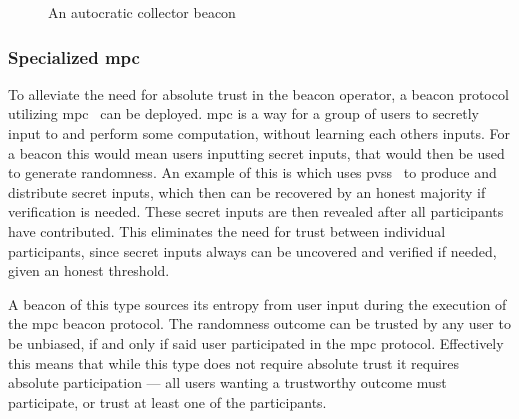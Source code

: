 \begin{figure*}[htb]
    \centering
    \footnotesize
    \caption{An autocratic collector beacon}\label{fig:autocratic_beacon}
\end{figure*}


\subsubsection{Specialized \gls{mpc}}\label{ssub:specialized_mpc}
To alleviate the need for absolute trust in the beacon operator, a beacon protocol utilizing \acrfull{mpc}~\cite{goldreich1998secure} can be deployed. \gls{mpc} is a way for a group of users to secretly input to and perform some computation, without learning each others inputs.
For a beacon this would mean users inputting secret inputs, that would then be used to generate randomness.
An example of this is  which uses \gls{pvss}~\cite{stadler1996publicly} to produce and distribute secret inputs, which then can be recovered by an honest majority if verification is needed.
These secret inputs are then revealed after all participants have contributed.
This eliminates the need for trust between individual participants, since secret inputs always can be uncovered and verified if needed, given an honest threshold.

A beacon of this type sources its entropy from user input during the execution of the \gls{mpc} beacon protocol.
The randomness outcome can be trusted by any user to be unbiased, if and only if said user participated in the \gls{mpc} protocol.
Effectively this means that while this type does not require absolute trust it requires absolute participation --- all users wanting a trustworthy outcome must participate, or trust at least one of the participants.


